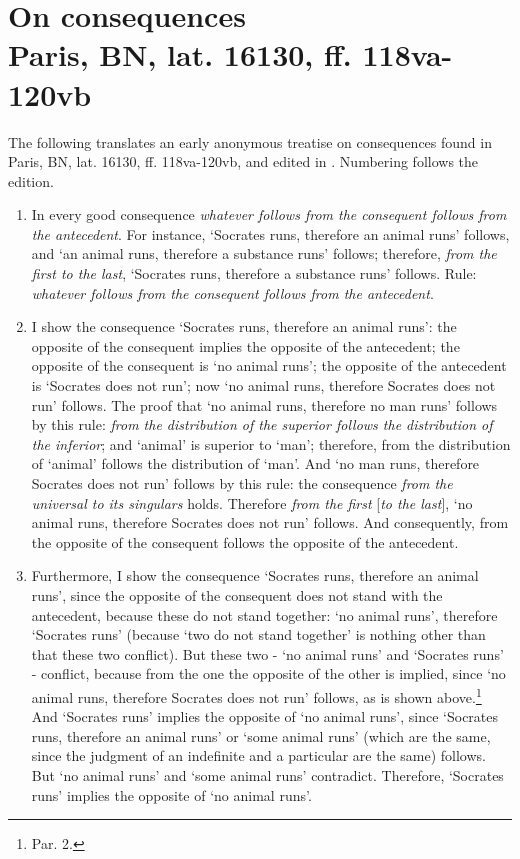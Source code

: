\chapter[Anonymous 2, on consequences]{On consequences \\ Paris, BN, lat. 16130, ff. 118va-120vb}
The following translates an early anonymous treatise on consequences found in Paris, BN, lat. 16130, ff. 118va-120vb, and edited in \cite[pp. 12-28]{Green-Pedersen1980a}. Numbering follows the edition.


\begin{enumerate}
\item[1.] In every good consequence \textit{whatever follows from the consequent follows from the antecedent}. For instance, `Socrates runs, therefore an animal runs' follows, and `an animal runs, therefore a substance runs' follows; therefore, \textit{from the first to the last}, `Socrates runs, therefore a substance runs' follows. Rule: \textit{whatever follows from the consequent follows from the antecedent}.
\item[2.] I show the consequence `Socrates runs, therefore an animal runs': the opposite of the consequent implies the opposite of the antecedent; the opposite of the consequent is `no animal runs'; the opposite of the antecedent is `Socrates does not run'; now `no animal runs, therefore Socrates does not run' follows. The proof that `no animal runs, therefore no man runs' follows by this rule: \textit{from the distribution of the superior follows the distribution of the inferior}; and `animal' is superior to `man'; therefore, from the distribution of `animal' follows the distribution of `man'. And `no man runs, therefore Socrates does not run' follows by this rule: the consequence \textit{from the universal to its singulars} holds. Therefore \textit{from the first} [\textit{to the last}], `no animal runs, therefore Socrates does not run' follows. And consequently, from the opposite of the consequent follows the opposite of the antecedent.
\item[3.] Furthermore, I show the consequence `Socrates runs, therefore an animal runs', since the opposite of the consequent does not stand with the antecedent, because these do not stand together: `no animal runs', therefore `Socrates runs' (because `two do not stand together' is nothing other than that these two conflict). But these two - `no animal runs' and `Socrates runs' - conflict, because from the one the opposite of the other is implied, since `no animal runs, therefore Socrates does not run' follows, as is shown above.\footnote{Par. 2.} And `Socrates runs' implies the opposite of `no animal runs', since `Socrates runs, therefore an animal runs' or `some animal runs' (which are the same, since the judgment of an indefinite and a particular are the same) follows. But `no animal runs' and `some animal runs' contradict. Therefore, `Socrates runs' implies the opposite of `no animal runs'.

\end{enumerate}
